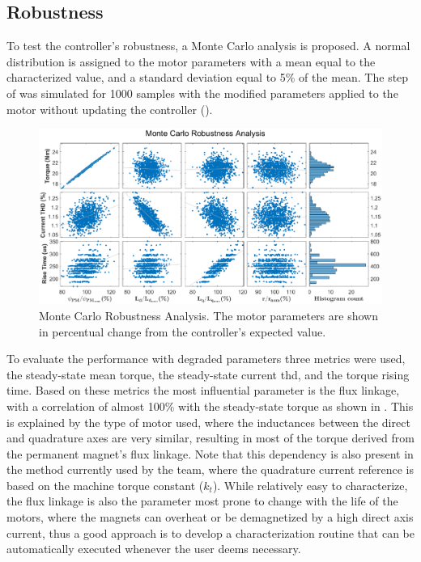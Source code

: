 \subsection{Robustness}

To test the controller's robustness, a Monte Carlo analysis is proposed. A normal distribution is assigned to the motor parameters with a mean equal to the characterized value, and a standard deviation equal to 5\% of the mean. The step of  was simulated for 1000 samples with the modified parameters applied to the motor without updating the controller ().

\begin{figure}[!htb]
	\centering
	\includegraphics[width=1\textwidth]{Figures/MonteCarlo.eps}
	\caption[Monte Carlo Robustness Analysis.]{Monte Carlo Robustness Analysis. The motor parameters are shown in percentual change from the controller's expected value.}
	\label{fig:montecarlo} %
\end{figure}

To evaluate the performance with degraded parameters three metrics were used, the steady-state mean torque, the steady-state current \gls{thd}, and the torque rising time. Based on these metrics the most influential parameter is the flux linkage, with a correlation of almost 100\% with the steady-state torque as shown in . This is explained by the type of motor used, where the inductances between the direct and quadrature axes are very similar, resulting in most of the torque derived from the permanent magnet's flux linkage. Note that this dependency is also present in the method currently used by the team, where the quadrature current reference is based on the machine torque constant ($k_t$). 
While relatively easy to characterize, the flux linkage is also the parameter most prone to change with the life of the motors, where the magnets can overheat or be demagnetized by a high direct axis current, thus a good approach is to develop a characterization routine that can be automatically executed whenever the user deems necessary.

